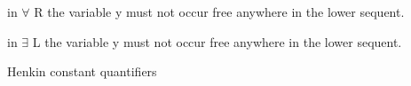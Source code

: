 \begin{prooftree}
\end{prooftree}
\quad
\begin{prooftree}
\end{prooftree}

in $\forall$ R the variable y must not occur free anywhere in the lower sequent.

\begin{prooftree}
\end{prooftree}
\quad
\begin{prooftree}
\end{prooftree}

in $\exists$ L the variable y must not occur free anywhere in the lower sequent.

\begin{prooftree}
\end{prooftree}
\quad
\begin{prooftree}
\end{prooftree}
\quad
\begin{prooftree}
\end{prooftree}
\quad
\begin{prooftree}
\end{prooftree}


Henkin constant quantifiers

\begin{prooftree}
\end{prooftree}
\quad
\begin{prooftree}
\end{prooftree}

\begin{prooftree}
\end{prooftree}
\quad
\begin{prooftree}
\end{prooftree}

